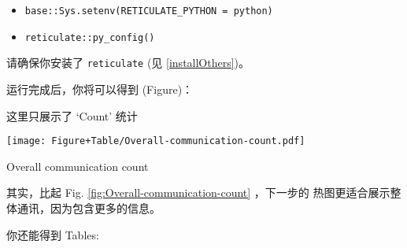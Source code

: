 \documentclass[
]{article}
\newenvironment{Shaded}{\begin{snugshade}}{\end{snugshade}}
\newcommand{\CommentTok}[1]{\textcolor[rgb]{0.56,0.35,0.01}{\textit{#1}}}
\newcommand{\NormalTok}[1]{#1}
\newcommand{\OperatorTok}[1]{\textcolor[rgb]{0.81,0.36,0.00}{\textbf{#1}}}
\providecommand{\tightlist}{%
  \setlength{\itemsep}{0pt}\setlength{\parskip}{0pt}}
\begin{document}
\begin{itemize}
\tightlist
\item
  \texttt{base::Sys.setenv(RETICULATE\_PYTHON\ =\ python)}
\item
  \texttt{reticulate::py\_config()}
\end{itemize}

请确保你安装了 \texttt{reticulate} (见 \ref{installOthers})。

运行完成后，你将可以得到 (Figure)：

\begin{Shaded}
\end{Shaded}

这里只展示了 `Count' 统计

\def\@captype{figure}
\begin{center}
\texttt{[image: Figure+Table/Overall-communication-count.pdf]}
\caption{Overall communication count}\label{fig:Overall-communication-count}
\end{center}

其实，比起 Fig. \ref{fig:Overall-communication-count} ，下一步的
热图更适合展示整体通讯，因为包含更多的信息。

你还能得到 Tables:

\begin{Shaded}
\end{Shaded}
\end{document}
